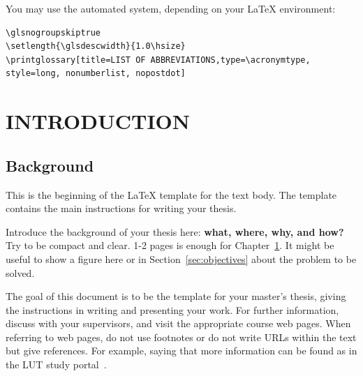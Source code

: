 \documentclass{lutmscthesis}[2017/10/03]
\begin{document}
You may use the automated system, depending on your LaTeX environment:
\begin{verbatim}
\glsnogroupskiptrue
\setlength{\glsdescwidth}{1.0\hsize}
\printglossary[title=LIST OF ABBREVIATIONS,type=\acronymtype, 
style=long, nonumberlist, nopostdot]
\end{verbatim}

%

\setlength{\parskip}{3ex}



\section{INTRODUCTION}
\label{sec:introduction}

\subsection{Background}
\label{sec:background}

This is the beginning of the LaTeX template for the text body. 
The template contains the main instructions for writing your thesis. 

Introduce the background of your thesis here: {\bf what, where, why, and how?}
Try to be compact and clear. 1-2 pages is enough for Chapter~\ref{sec:introduction}. 
It might be useful to show a figure here or in Section~\ref{sec:objectives} about the problem to be solved. 

The goal of this document is to be the template for your master's thesis, giving the instructions in writing and presenting your work. 
For further information, discuss with your supervisors, and visit the appropriate course web pages. 
When referring to web pages, do not use footnotes or do not write URLs within the text but give references. 
For example, saying that more information can be found as in the LUT study portal~\cite{lutstudyportal}.
\end{document}
